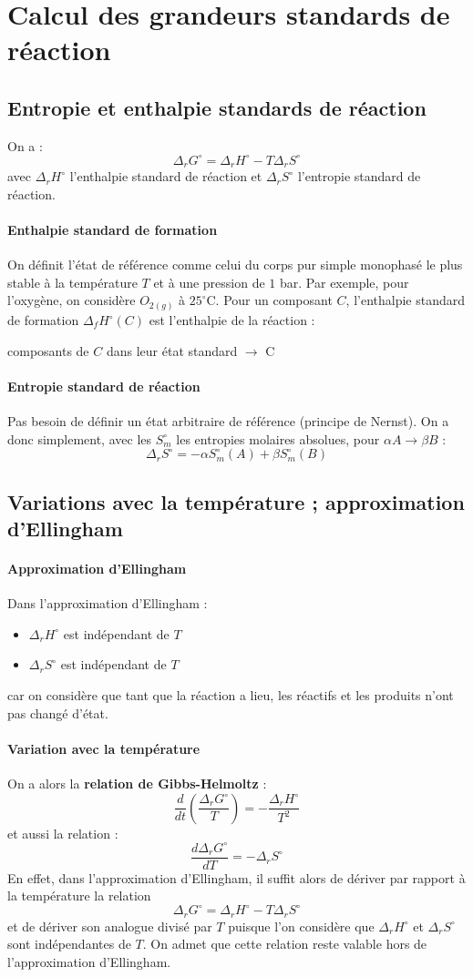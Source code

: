 \documentclass[french]{book}
\theoremstyle{plain}
\theoremstyle{definition}
\theoremstyle{remark}
\begin{document}
\section{Calcul des grandeurs standards de réaction}
\subsection{Entropie et enthalpie standards de réaction}
On a : $$\Delta_rG^\circ=\Delta_rH^\circ-T\Delta_rS^\circ$$ avec $\Delta_rH^\circ$ l'enthalpie standard de réaction et $\Delta_rS^\circ$ l'entropie standard de réaction.
\paragraph{Enthalpie standard de formation} On définit l'état de référence comme celui du corps pur simple monophasé le plus stable à la température $T$ et à une pression de $1$ bar. Par exemple, pour l'oxygène, on considère $O_{2(g)}$ à $25^\circ$C. Pour un composant $C$, l'enthalpie standard de formation $\Delta_fH^\circ(C)$ est l'enthalpie de la réaction :
\begin{center}
	composants de $C$ dans leur état standard $\longrightarrow$ C
\end{center}
\paragraph{Entropie standard de réaction} Pas besoin de définir un état arbitraire de référence (principe de Nernst). On a donc simplement, avec les $S_m^\circ$ les entropies molaires absolues, pour $\alpha A\to\beta B$ :$$\Delta_rS^\circ =	-\alpha S_m^\circ(A)+\beta S_m^\circ(B)$$
\subsection{Variations avec la température ; approximation d'Ellingham}
\paragraph{Approximation d'Ellingham} Dans l'approximation d'Ellingham : 
\begin{itemize}
	\item $\Delta_rH^\circ$ est indépendant de $T$
	\item $\Delta_rS^\circ$ est indépendant de $T$
\end{itemize} car on considère que tant que la réaction a lieu, les réactifs et les produits n'ont pas changé d'état.
\paragraph{Variation avec la température} On a alors la \textbf{relation de Gibbs-Helmoltz} : $$\frac{d}{dt}\left(\frac{\Delta_rG^\circ}{T}\right)=-\frac{\Delta_rH^\circ}{T^2}$$ et aussi la relation : $$\frac{d\Delta_rG^\circ}{dT}=-\Delta_rS^\circ$$ En effet, dans l'approximation d'Ellingham, il suffit alors de dériver par rapport à la température la relation $$\Delta_rG^\circ=\Delta_rH^\circ-T\Delta_rS^\circ$$ et de dériver son analogue divisé par $T$ puisque l'on considère que $\Delta_rH^\circ$ et $\Delta_rS^\circ$ sont indépendantes de $T$. On admet que cette relation reste valable hors de l'approximation d'Ellingham.
\end{document}
